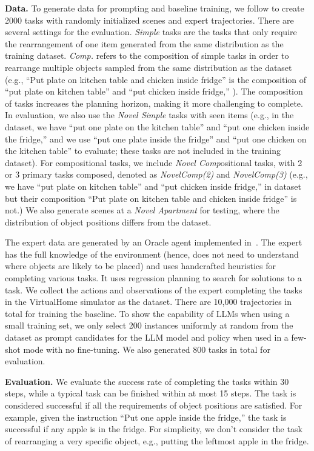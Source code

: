 

\textbf{Data.}
To generate data for prompting and baseline training, we follow \cite{puig2020watch} to create 2000 tasks with randomly initialized scenes and expert trajectories. There are several settings for the evaluation. \textit{Simple} tasks are the tasks that only require the rearrangement of one item generated from the same distribution as the training dataset. \textit{Comp.} refers to the composition of simple tasks in order to rearrange multiple objects sampled from the same distribution as the dataset (e.g., ``Put plate on kitchen table and chicken inside fridge'' is the composition of ``put plate on kitchen table'' and ``put chicken inside fridge,'' ). The composition of tasks increases the planning horizon, making it more challenging to complete.
In evaluation, we also use the \textit{Novel Simple} tasks with seen items 
(e.g., in the dataset, we have ``put one plate on the kitchen table'' and ``put one chicken inside the fridge,'' and we use ``put one plate inside the fridge'' and ``put one chicken on the kitchen table'' to evaluate; these tasks are not included in the training dataset). 
For compositional tasks, we include \textit{Novel Comp}ositional tasks, with 2 or 3 primary tasks composed, denoted as \emph{NovelComp(2)} and \emph{NovelComp(3)} (e.g., we have ``put plate on kitchen table'' and ``put chicken inside fridge,'' in dataset but their composition ``Put plate on kitchen table and chicken inside fridge'' is not.) We also generate scenes at a \textit{Novel Apartment} for testing, where the distribution of object positions differs from the dataset. 

The expert data are generated by an Oracle agent implemented in~\cite{puig2020watch}. The expert has the full knowledge of the environment (hence, does not need to understand where objects are likely to be placed) and uses handcrafted heuristics for completing various tasks. It uses regression planning to search for solutions to a task. We collect the actions and observations of the expert completing the tasks in the VirtualHome simulator as the dataset. There are 10,000 trajectories in total for training the baseline. To show the capability of LLMs when using a small training set, we only select 200 instances uniformly at random from the dataset as prompt candidates for the LLM model and policy when used in a few-shot mode with no fine-tuning. We also generated 800 tasks in total for evaluation. 

\textbf{Evaluation.} We evaluate the success rate of completing the tasks within 30 steps, while a typical task can be finished within at most 15 steps. The task is considered successful if all the requirements of object positions are satisfied. For example, given the instruction ``Put one apple inside the fridge,'' the task is successful if any apple is in the fridge. For simplicity, we don't consider the task of rearranging a very specific object, e.g., putting the leftmost apple in the fridge. 


